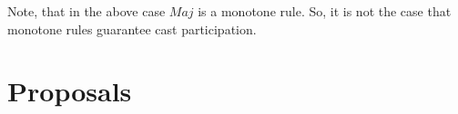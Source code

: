 \documentclass[11pt,a4paper, titlepage]{article}
\theoremstyle{definition}
\begin{document}
Note, that in the above case $\mathit{Maj}$ is a monotone rule. So, it is not the case that monotone rules guarantee cast participation.

\iffalse
Plan for this section:
1) Cast participation is achieved only for monotone functions. So, let's focus on monotone functions
2) Prove NP-hardness for MinMax, MinSum using only binary or and binary and.
3) Prove that no constant approximator to MinMax or MinSum exists.
4) Result on whether we are able to even determine whether a vote is achievable.
5) Generalise on why the proof works for all non-delegative, fair and monotone functions. 
\fi

\newpage
\section{Proposals}
\end{document}
